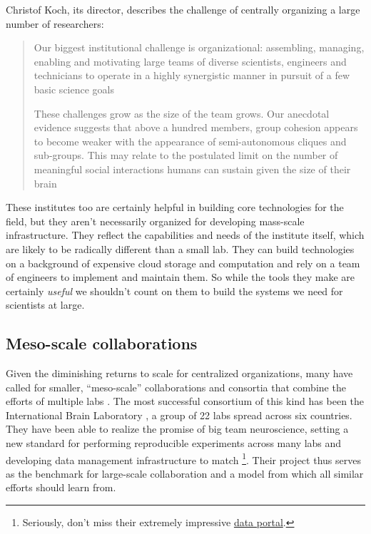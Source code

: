 Christof Koch, its director, describes the challenge of centrally
organizing a large number of researchers:

\begin{quote}
Our biggest institutional challenge is organizational: assembling,
managing, enabling and motivating large teams of diverse scientists,
engineers and technicians to operate in a highly synergistic manner in
pursuit of a few basic science goals \citep{grillnerWorldwideInitiativesAdvance2016} 

These challenges grow as the size of the team grows. Our anecdotal
evidence suggests that above a hundred members, group cohesion appears
to become weaker with the appearance of semi-autonomous cliques and
sub-groups. This may relate to the postulated limit on the number of
meaningful social interactions humans can sustain given the size of
their brain \citep{kochBigScienceTeam2016} 
\end{quote}

These institutes too are certainly helpful in building core technologies
for the field, but they aren't necessarily organized for developing
mass-scale infrastructure. They reflect the capabilities and needs of
the institute itself, which are likely to be radically different than a
small lab. They can build technologies on a background of expensive
cloud storage and computation and rely on a team of engineers to
implement and maintain them. So while the tools they make are certainly
\emph{useful} we shouldn't count on them to build the systems we need
for scientists at large.

\hypertarget{meso-scale-collaborations}{%
\subsection{Meso-scale collaborations}\label{meso-scale-collaborations}}

Given the diminishing returns to scale for centralized organizations,
many have called for smaller, ``meso-scale'' collaborations and
consortia that combine the efforts of multiple labs \citep{mainenBetterWayCrack2016} . The most successful consortium of this
kind has been the International Brain Laboratory \citep{abbottInternationalLaboratorySystems2017, woolKnowledgeNetworksHow2020} , a group of 22 labs spread across six countries. They have been
able to realize the promise of big team neuroscience, setting a new
standard for performing reproducible experiments across many labs \citep{laboratoryStandardizedReproducibleMeasurement2020}  and
developing data management infrastructure to match \citep{laboratoryDataArchitectureLargescale2020} \footnote{Seriously, don't
  miss their extremely impressive
  \href{https://data.internationalbrainlab.org/}{data portal}.}. Their
project thus serves as the benchmark for large-scale collaboration and a
model from which all similar efforts should learn from.


